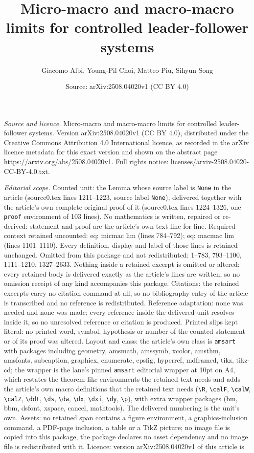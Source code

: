 \documentclass[10pt,a4paper]{amsart}
\title[Micro-macro and macro-macro limits for controlled leader-fol]{Micro-macro and macro-macro limits for controlled leader-follower systems}
\author{Giacomo Albi, Young-Pil Choi, Matteo Piu, Sihyun Song}
\date{Source: arXiv:2508.04020v1 (CC BY 4.0)}
\begin{document}
\maketitle

\noindent\emph{Source and licence.} Micro-macro and macro-macro limits for controlled leader-follower systems. Version arXiv:2508.04020v1 (CC BY 4.0), distributed under the Creative Commons Attribution 4.0 International licence, as recorded in the arXiv licence metadata for this exact version and shown on the abstract page https://arxiv.org/abs/2508.04020v1. Full rights notice: licenses/arxiv-2508.04020-CC-BY-4.0.txt.\par\smallskip

\noindent\textit{Editorial scope.} Counted unit: the Lemma whose source label is \texttt{None} in the article (source0.tex lines 1211--1223, source label \texttt{None}), delivered together with the article's own complete original proof of it (source0.tex lines 1224--1326, one \texttt{proof} environment of 103 lines). No mathematics is written, repaired or re-derived: statement and proof are the article's own text line for line. Required context retained uncounted: eq: micmac lim (lines 784--792); eq: macmac lim (lines 1101--1110). Every definition, display and label of those lines is retained unchanged. Omitted from this package and not redistributed: 1--783, 793--1100, 1111--1210, 1327--2633. Nothing inside a retained excerpt is omitted or altered: every retained body is delivered exactly as the article's lines are written, so no omission receipt of any kind accompanies this package. Citations: the retained excerpts carry no citation command at all, so no bibliography entry of the article is transcribed and no reference is redistributed. Reference adaptation: none was needed and none was made; every reference inside the delivered unit resolves inside it, so no unresolved reference or citation is produced. Printed slips kept literal: no printed word, symbol, hypothesis or number of the counted statement or of its proof was altered. Layout and class: the article's own class is \texttt{amsart} with packages including geometry, amsmath, amssymb, xcolor, amsthm, amsfonts, subcaption, graphicx, enumerate, epsfig, hyperref, mdframed, tikz, tikz-cd; the wrapper is the lane's pinned \texttt{amsart} editorial wrapper at 10pt on A4, which restates the theorem-like environments the retained text needs and adds the article's own macro definitions that the retained text needs (\texttt{\textbackslash R}, \texttt{\textbackslash calF}, \texttt{\textbackslash calW}, \texttt{\textbackslash calZ}, \texttt{\textbackslash ddt}, \texttt{\textbackslash ds}, \texttt{\textbackslash dw}, \texttt{\textbackslash dx}, \texttt{\textbackslash dxi}, \texttt{\textbackslash dy}, \texttt{\textbackslash p}), with extra wrapper packages (bm, bbm, dsfont, xspace, cancel, mathtools). The delivered numbering is the unit's own. Assets: no retained span contains a figure environment, a graphics-inclusion command, a PDF-page inclusion, a table or a TikZ picture; no image file is copied into this package, the package declares no asset dependency and no image file is redistributed with it. Licence: version arXiv:2508.04020v1 of this article is 
\end{document}
